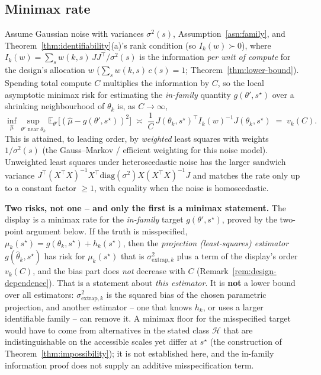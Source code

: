 \subsection{Minimax rate}
\label{sec:theorem3-minimax}

\begin{theorem}
\label{thm:minimax}
Assume Gaussian noise with variances $\sigma^2(s)$, Assumption~\ref{asn:family}, and
Theorem~\ref{thm:identifiability}(a)'s rank condition (so $I_k(w) \succ 0$), where
$I_k(w) = \sum_s w(k,s)\, J J^\top / \sigma^2(s)$ is the information \emph{per unit of
compute} for the design's allocation $w$ ($\sum_s w(k,s)\, c(s) = 1$; Theorem~\ref{thm:lower-bound}).
Spending total compute $C$ multiplies the information by $C$, so
the local asymptotic minimax risk for estimating the \emph{in-family} quantity
$g(\theta', s^\star)$ over a shrinking neighbourhood of $\theta_k$ is, as $C \to \infty$,
\[
  \inf_{\hat\mu} \sup_{\theta' \text{ near } \theta_k} \mathbb{E}_{\theta'}\big[
    (\hat\mu - g(\theta', s^\star))^2 \big]
  \;\asymp\; \frac{1}{C}\, J(\theta_k, s^\star)^\top I_k(w)^{-1} J(\theta_k, s^\star)
  \;=\; v_k(C).
\]
This is attained, to leading order, by \emph{weighted} least squares with weights
$1/\sigma^2(s)$ (the Gauss--Markov / efficient weighting for this noise model). Unweighted
least squares under heteroscedastic noise has the larger sandwich variance
$J^\top (X^\top X)^{-1} X^\top \mathrm{diag}(\sigma^2) X (X^\top X)^{-1} J$
and matches the rate only up to a constant factor $\ge 1$, with equality when the noise is
homoscedastic.

\textbf{Two risks, not one -- and only the first is a minimax statement.} The display is a
minimax rate for the \emph{in-family} target $g(\theta', s^\star)$, proved by the two-point
argument below. If the truth is misspecified, $\mu_k(s^\star) = g(\theta_k, s^\star) +
h_k(s^\star)$, then the \emph{projection (least-squares) estimator} $g(\hat\theta_k,
s^\star)$ has risk for $\mu_k(s^\star)$ that is $\sigma^2_{\mathrm{extrap},k}$ plus a term of
the display's order $v_k(C)$, and the bias part does \emph{not} decrease with $C$
(Remark~\ref{rem:design-dependence}). That is a statement about \emph{this estimator}. It is
\textbf{not} a lower bound over all estimators: $\sigma^2_{\mathrm{extrap},k}$ is the
squared bias of the chosen parametric projection, and another estimator -- one that knows
$h_k$, or uses a larger identifiable family -- can remove it. A minimax floor for the
misspecified target would have to come from alternatives in the stated class
$\mathcal{H}$ that are indistinguishable on the accessible scales yet differ at $s^\star$
(the construction of Theorem~\ref{thm:impossibility}); it is not established here, and the
in-family information proof does not supply an additive misspecification term.
\end{theorem}

